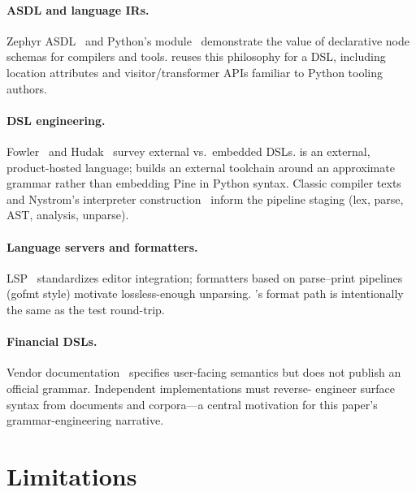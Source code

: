 \documentclass[11pt,a4paper]{article}
\begin{document}
\paragraph{ASDL and language IRs.}
Zephyr ASDL~\citep{wang1997asdl} and Python's  module~\citep{asdl-python}
demonstrate the value of declarative node schemas for compilers and tools.
\pyne{} reuses this philosophy for a DSL, including location attributes and
visitor/transformer APIs familiar to Python tooling authors.

\paragraph{DSL engineering.}
Fowler~\citep{fowler2010dsl} and Hudak~\citep{hudak1996dsl} survey external vs.\
embedded DSLs. \pine{} is an external, product-hosted language; \pyne{} builds an
external toolchain around an approximate grammar rather than embedding Pine in
Python syntax. Classic compiler texts~\citep{aho2006dragon,cooper2012engineering}
and Nystrom's interpreter construction~\citep{nystrom2021crafting} inform the
pipeline staging (lex, parse, AST, analysis, unparse).

\paragraph{Language servers and formatters.}
LSP~\citep{lsp2023} standardizes editor integration; formatters based on
parse--print pipelines (go\-fmt style) motivate lossless-enough unparsing.
\pyne{}'s format path is intentionally the same as the test round-trip.

\paragraph{Financial DSLs.}
Vendor documentation~\citep{tradingview-pine} specifies user-facing semantics but
does not publish an official grammar. Independent implementations must reverse-
engineer surface syntax from documents and corpora---a central motivation for
this paper's grammar-engineering narrative.

\section{Limitations}
\label{sec:limitations}
\end{document}
